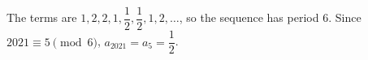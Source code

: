 The terms are $1,2,2,1,\dfrac12,\dfrac12,1,2,\dots$, so the sequence has period $6$. Since $2021\equiv5\pmod6$, $a_{2021}=a_5=\boxed{\dfrac12}$.

